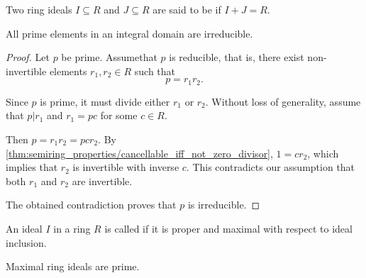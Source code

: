 \begin{definition}\label{def:coprime_ring_ideal}
  Two ring ideals \( I \subseteq R \) and \( J \subseteq R \) are said to be  if \( I + J = R \).
\end{definition}

\begin{proposition}\label{thm:prime_implies_irreducible}\cite[389]{Knapp2016BAlg}
  All prime elements in an integral domain are irreducible.
\end{proposition}
\begin{proof}
  Let \( p \) be prime. Assume\LEM that \( p \) is reducible, that is, there exist non-invertible elements \( r_1, r_2 \in R \) such that
  \begin{equation*}
    p = r_1 r_2.
  \end{equation*}

  Since \( p \) is prime, it must divide either \( r_1 \) or \( r_2 \). Without loss of generality, assume that \( p | r_1 \) and \( r_1 = pc \) for some \( c \in R \).

  Then \( p = r_1 r_2 = pc r_2 \). By \cref{thm:semiring_properties/cancellable_iff_not_zero_divisor}, \( 1 = c r_2 \), which implies that \( r_2 \) is invertible with inverse \( c \). This contradicts our assumption that both \( r_1 \) and \( r_2 \) are invertible.

  The obtained contradiction proves that \( p \) is irreducible.
\end{proof}

\begin{definition}\label{def:maximal_ideal}
  An ideal \( I \) in a ring \( R \) is called  if it is proper and maximal with respect to ideal inclusion.
\end{definition}

\begin{proposition}\label{thm:maximal_ideals_are_prime}
  Maximal ring ideals are prime.
\end{proposition}

